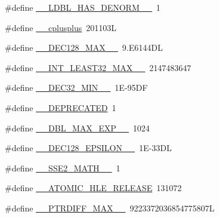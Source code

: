 \begin{DoxyCompactItemize}
\item 
\#define \hyperlink{build-analizer__host-_desktop___qt__5__9__0___g_c_c__64bit-debug_2moc__predefs_8h_a3c7f3130e367d47bcc27a0a41278155e}{\+\_\+\+\_\+\+L\+D\+B\+L\+\_\+\+H\+A\+S\+\_\+\+D\+E\+N\+O\+R\+M\+\_\+\+\_\+}~1
\item 
\#define \hyperlink{build-analizer__host-_desktop___qt__5__9__0___g_c_c__64bit-debug_2moc__predefs_8h_a1b391bc7ed92f79666c4a5d840aa1edd}{\+\_\+\+\_\+cplusplus}~201103\+L
\item 
\#define \hyperlink{build-analizer__host-_desktop___qt__5__9__0___g_c_c__64bit-debug_2moc__predefs_8h_aaab7817ee2e4bb88b5178e101e7ab2a6}{\+\_\+\+\_\+\+D\+E\+C128\+\_\+\+M\+A\+X\+\_\+\+\_\+}~9.\+E6144\+D\+L
\item 
\#define \hyperlink{build-analizer__host-_desktop___qt__5__9__0___g_c_c__64bit-debug_2moc__predefs_8h_a97e13c059a63d2d547cc4a9f386641d2}{\+\_\+\+\_\+\+I\+N\+T\+\_\+\+L\+E\+A\+S\+T32\+\_\+\+M\+A\+X\+\_\+\+\_\+}~2147483647
\item 
\#define \hyperlink{build-analizer__host-_desktop___qt__5__9__0___g_c_c__64bit-debug_2moc__predefs_8h_a1f993b902b5b1dba7d5b043d0abc347b}{\+\_\+\+\_\+\+D\+E\+C32\+\_\+\+M\+I\+N\+\_\+\+\_\+}~1\+E-\/95\+D\+F
\item 
\#define \hyperlink{build-analizer__host-_desktop___qt__5__9__0___g_c_c__64bit-debug_2moc__predefs_8h_aa806e8f7ce2a8db3bf676735fca2ac51}{\+\_\+\+\_\+\+D\+E\+P\+R\+E\+C\+A\+T\+E\+D}~1
\item 
\#define \hyperlink{build-analizer__host-_desktop___qt__5__9__0___g_c_c__64bit-debug_2moc__predefs_8h_a9a8a7cd9484baf4b72ab15682745d119}{\+\_\+\+\_\+\+D\+B\+L\+\_\+\+M\+A\+X\+\_\+\+E\+X\+P\+\_\+\+\_\+}~1024
\item 
\#define \hyperlink{build-analizer__host-_desktop___qt__5__9__0___g_c_c__64bit-debug_2moc__predefs_8h_abd2230e0e187a5bae549a0ba786b311b}{\+\_\+\+\_\+\+D\+E\+C128\+\_\+\+E\+P\+S\+I\+L\+O\+N\+\_\+\+\_\+}~1\+E-\/33\+D\+L
\item 
\#define \hyperlink{build-analizer__host-_desktop___qt__5__9__0___g_c_c__64bit-debug_2moc__predefs_8h_ad8885a68f76fac734a20349f9b8cac69}{\+\_\+\+\_\+\+S\+S\+E2\+\_\+\+M\+A\+T\+H\+\_\+\+\_\+}~1
\item 
\#define \hyperlink{build-analizer__host-_desktop___qt__5__9__0___g_c_c__64bit-debug_2moc__predefs_8h_a6bb8315e719b7306f47cde3b4b30d91f}{\+\_\+\+\_\+\+A\+T\+O\+M\+I\+C\+\_\+\+H\+L\+E\+\_\+\+R\+E\+L\+E\+A\+S\+E}~131072
\item 
\#define \hyperlink{build-analizer__host-_desktop___qt__5__9__0___g_c_c__64bit-debug_2moc__predefs_8h_ac29c76a6702808cfc4a5f661d0d33c2c}{\+\_\+\+\_\+\+P\+T\+R\+D\+I\+F\+F\+\_\+\+M\+A\+X\+\_\+\+\_\+}~9223372036854775807\+L

\end{DoxyCompactItemize}
